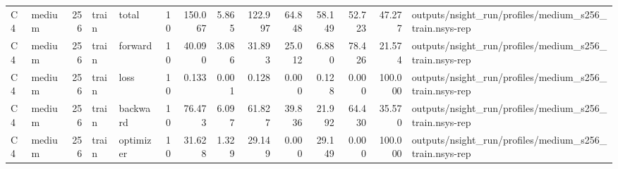 \begin{tabular}{llrllrrrrrrrrl}
C4 & medium & 256 & train & total & 10 & 150.067 & 5.865 & 122.997 & 64.848 & 58.149 & 52.723 & 47.277 & outputs/nsight\_run/profiles/medium\_s256\_train.nsys-rep \\
C4 & medium & 256 & train & forward & 10 & 40.090 & 3.086 & 31.893 & 25.012 & 6.880 & 78.426 & 21.574 & outputs/nsight\_run/profiles/medium\_s256\_train.nsys-rep \\
C4 & medium & 256 & train & loss & 10 & 0.133 & 0.001 & 0.128 & 0.000 & 0.128 & 0.000 & 100.000 & outputs/nsight\_run/profiles/medium\_s256\_train.nsys-rep \\
C4 & medium & 256 & train & backward & 10 & 76.473 & 6.097 & 61.827 & 39.836 & 21.992 & 64.430 & 35.570 & outputs/nsight\_run/profiles/medium\_s256\_train.nsys-rep \\
C4 & medium & 256 & train & optimizer & 10 & 31.628 & 1.329 & 29.149 & 0.000 & 29.149 & 0.000 & 100.000 & outputs/nsight\_run/profiles/medium\_s256\_train.nsys-rep \\
\bottomrule
\end{tabular}
